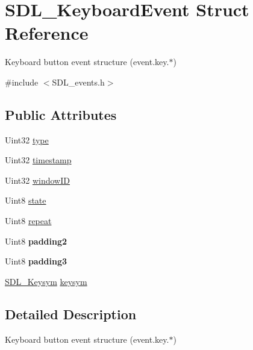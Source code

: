 \hypertarget{struct_s_d_l___keyboard_event}{}\section{S\+D\+L\+\_\+\+Keyboard\+Event Struct Reference}
\label{struct_s_d_l___keyboard_event}


Keyboard button event structure (event.\+key.$\ast$)  




{\ttfamily \#include $<$S\+D\+L\+\_\+events.\+h$>$}

\subsection*{Public Attributes}
\begin{DoxyCompactItemize}
\item 
Uint32 \mbox{\hyperlink{struct_s_d_l___keyboard_event_ae0b2f2aace6f80c1f47e5a14350d409a}{type}}
\item 
Uint32 \mbox{\hyperlink{struct_s_d_l___keyboard_event_a3da1d8f6892e7f6ee28d9eafdb5e7d02}{timestamp}}
\item 
Uint32 \mbox{\hyperlink{struct_s_d_l___keyboard_event_a56efb6780b96acd5b50d8f797efb3546}{window\+ID}}
\item 
Uint8 \mbox{\hyperlink{struct_s_d_l___keyboard_event_a110558eb96c113c86cfa31a7018c2346}{state}}
\item 
Uint8 \mbox{\hyperlink{struct_s_d_l___keyboard_event_a3edac3b36304812d533795c9df4ed4c1}{repeat}}
\item 
\mbox{\label{struct_s_d_l___keyboard_event_ae270122f757f76171318294afd2c95e6}} 
Uint8 {\bfseries padding2}
\item 
\mbox{\label{struct_s_d_l___keyboard_event_ae1831035ef556a7b09efcd2469f26f7a}} 
Uint8 {\bfseries padding3}
\item 
\mbox{\hyperlink{struct_s_d_l___keysym}{S\+D\+L\+\_\+\+Keysym}} \mbox{\hyperlink{struct_s_d_l___keyboard_event_a2a57ba820a298f2c02ad5d41fd2b1aa8}{keysym}}
\end{DoxyCompactItemize}


\subsection{Detailed Description}
Keyboard button event structure (event.\+key.$\ast$) 

